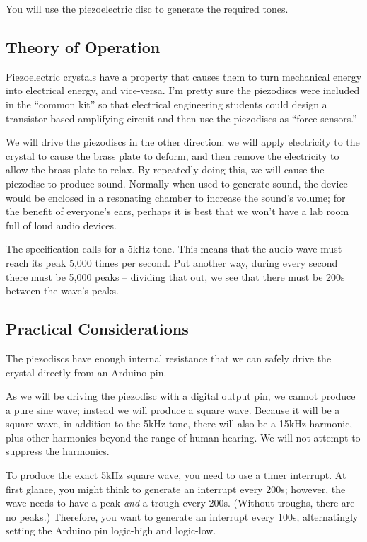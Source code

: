 You will use the piezoelectric disc to generate the required tones.

\subsection{Theory of Operation}

Piezoelectric crystals have a property that causes them to turn mechanical energy into electrical energy, and vice-versa.
I'm pretty sure the piezodiscs were included in the ``common kit'' so that electrical engineering students could design a transistor-based amplifying circuit and then use the piezodiscs as ``force sensors.''

We will drive the piezodiscs in the other direction: we will apply electricity to the crystal to cause the brass plate to deform, and then remove the electricity to allow the brass plate to relax.
By repeatedly doing this, we will cause the piezodisc to produce sound.
Normally when used to generate sound, the device would be enclosed in a resonating chamber to increase the sound's volume;
for the benefit of everyone's ears, perhaps it is best that we won't have a lab room full of loud audio devices.

The specification calls for a 5kHz tone.
This means that the audio wave must reach its peak 5,000 times per second.
Put another way, during every second there must be 5,000 peaks -- dividing that out, we see that there must be 200\textmu s between the wave's peaks.

\subsection{Practical Considerations}

The piezodiscs have enough internal resistance that we can safely drive the crystal directly from an Arduino pin.

As we will be driving the piezodisc with a digital output pin, we cannot produce a pure sine wave;
instead we will produce a square wave.
Because it will be a square wave, in addition to the 5kHz tone, there will also be a 15kHz harmonic, plus other harmonics beyond the range of human hearing.
We will not attempt to suppress the harmonics.

To produce the exact 5kHz square wave, you need to use a timer interrupt.
At first glance, you might think to generate an interrupt every 200\textmu s;
however, the wave needs to have a peak \textit{and} a trough every 200\textmu s.
(Without troughs, there are no peaks.)
Therefore, you want to generate an interrupt every 100\textmu s, alternatingly setting the Arduino pin logic-high and logic-low.

